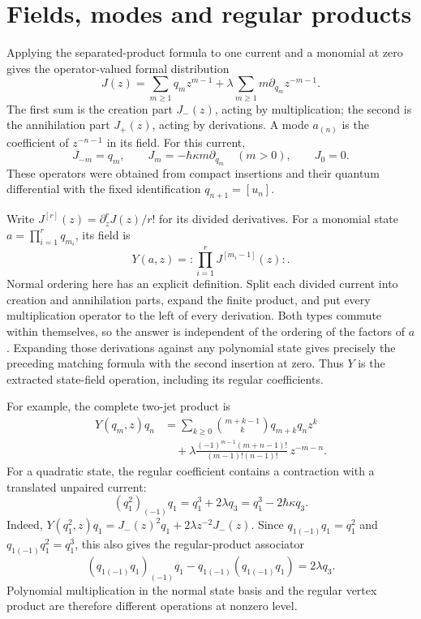 \section{Fields, modes and regular products}

Applying the separated-product formula to one current and a monomial
at zero gives the operator-valued formal distribution
\[
 J(z)=\sum_{m\ge1}q_m z^{m-1}
           +\lambda\sum_{m\ge1}m\partial_{q_m}z^{-m-1}.
\]
The first sum is the creation part $J_-(z)$, acting by multiplication;
the second is the annihilation part $J_+(z)$, acting by derivations.
A mode $a_{(n)}$ is the coefficient of $z^{-n-1}$ in its field.
For this current,
\[
 J_{-m}=q_m,\qquad
 J_m=-\hbar\kappa m\partial_{q_m}\quad(m>0),\qquad J_0=0.
\]
These operators were obtained from compact insertions and their
quantum differential with the fixed identification $q_{n+1}=[u_n]$.

Write $J^{[r]}(z)=\partial_z^rJ(z)/r!$ for its divided derivatives.
For a monomial state $a=\prod_{i=1}^r q_{m_i}$, its field is
\[
 Y(a,z)=:\prod_{i=1}^rJ^{[m_i-1]}(z):.
\]
Normal ordering here has an explicit definition.  Split each divided
current into creation and annihilation parts, expand the finite
product, and put every multiplication operator to the left of every
derivation.  Both types commute within themselves, so the answer is
independent of the ordering of the factors of $a$.  Expanding those
derivations against any polynomial state gives precisely the preceding
matching formula with the second insertion at zero.  Thus $Y$ is the
extracted state-field operation, including its regular coefficients.

For example, the complete two-jet product is
\[
 \begin{split}
 Y(q_m,z)q_n
 &=\sum_{k\ge0}\binom{m+k-1}{k}q_{m+k}q_nz^k\\
 &\quad+\lambda\frac{(-1)^{m-1}(m+n-1)!}
                 {(m-1)!(n-1)!}\,z^{-m-n}.
 \end{split}
\]
For a quadratic state, the regular coefficient contains a contraction
with a translated unpaired current:
\[
 (q_1^2)_{(-1)}q_1=q_1^3+2\lambda q_3
                  =q_1^3-2\hbar\kappa q_3.
\]
Indeed,
$Y(q_1^2,z)q_1=J_-(z)^2q_1+2\lambda z^{-2}J_-(z)$.
Since $q_{1(-1)}q_1=q_1^2$ and $q_{1(-1)}q_1^2=q_1^3$,
this also gives the regular-product associator
\[
 (q_{1(-1)}q_1)_{(-1)}q_1
       -q_{1(-1)}(q_{1(-1)}q_1)=2\lambda q_3.
\]
Polynomial multiplication in the normal state basis and the regular
vertex product are therefore different operations at nonzero level.

